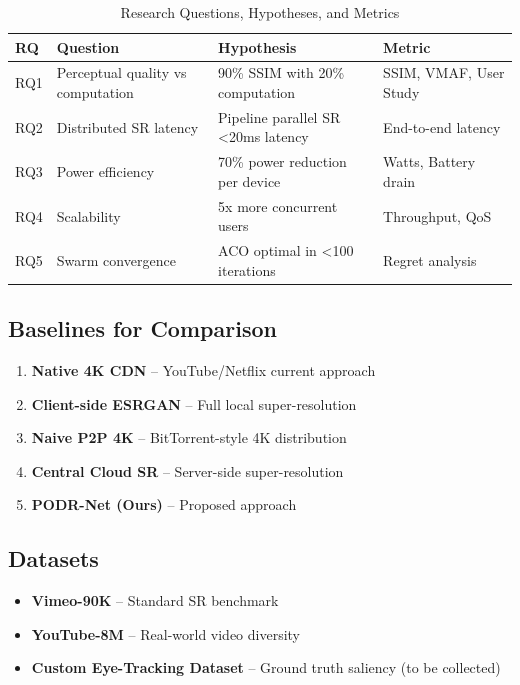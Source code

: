 \documentclass[11pt, a4paper]{article}
\begin{document}
\begin{table}[H]
\centering
\caption{Research Questions, Hypotheses, and Metrics}
\label{tab:rqs}
\begin{tabular}{>{\raggedright}p{1cm} >{\raggedright}p{3.5cm} >{\raggedright}p{4.5cm} p{3cm}}
\toprule
\textbf{RQ} & \textbf{Question} & \textbf{Hypothesis} & \textbf{Metric} \\
\midrule
\rowcolor{lightbg} RQ1 & Perceptual quality vs computation & 90\% SSIM with 20\% computation & SSIM, VMAF, User Study \\
RQ2 & Distributed SR latency & Pipeline parallel SR <20ms latency & End-to-end latency \\
\rowcolor{lightbg} RQ3 & Power efficiency & 70\% power reduction per device & Watts, Battery drain \\
RQ4 & Scalability & 5x more concurrent users & Throughput, QoS \\
\rowcolor{lightbg} RQ5 & Swarm convergence & ACO optimal in <100 iterations & Regret analysis \\
\bottomrule
\end{tabular}
\end{table}

\subsection{Baselines for Comparison}

\begin{enumerate}[label=\textcolor{primaryblue}{\arabic*.}, leftmargin=*]
    \item \textbf{Native 4K CDN} -- YouTube/Netflix current approach
    \item \textbf{Client-side ESRGAN} -- Full local super-resolution
    \item \textbf{Naive P2P 4K} -- BitTorrent-style 4K distribution
    \item \textbf{Central Cloud SR} -- Server-side super-resolution
    \item \textbf{PODR-Net (Ours)} -- Proposed approach
\end{enumerate}

\subsection{Datasets}

\begin{itemize}[leftmargin=*]
    \item \textbf{Vimeo-90K} -- Standard SR benchmark
    \item \textbf{YouTube-8M} -- Real-world video diversity
    \item \textbf{Custom Eye-Tracking Dataset} -- Ground truth saliency (to be collected)
\end{itemize}
\end{document}

